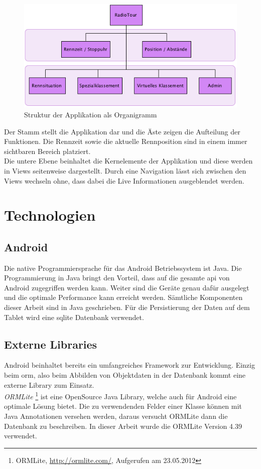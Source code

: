 \begin{figure}[h!]
\caption{Struktur der Applikation als Organigramm}
\centering
\includegraphics{05bericht/images/struktur.png}
\end{figure} 

Der Stamm stellt die Applikation dar und die Äste zeigen die Aufteilung der Funktionen. Die Rennzeit sowie die aktuelle Rennposition sind in einem immer sichtbaren Bereich platziert.
\\
Die untere Ebene beinhaltet die Kernelemente der Applikation und diese werden in Views seitenweise dargestellt. Durch eine Navigation lässt sich zwischen den Views wechseln ohne, dass dabei die Live Informationen ausgeblendet werden.


\section{Technologien}
\subsection{Android}
Die native Programmiersprache für das Android Betriebssystem ist Java. Die Programmierung in Java bringt den Vorteil, dass auf die gesamte \gls{api} von Android zugegriffen werden kann. Weiter sind die Geräte genau dafür ausgelegt und die optimale Performance kann erreicht werden. Sämtliche Komponenten dieser Arbeit sind in Java geschrieben. Für die Persistierung der Daten auf dem Tablet wird eine \gls{sqlite} Datenbank verwendet.

\subsection{Externe Libraries}
Android beinhaltet bereits ein umfangreiches Framework zur Entwicklung. Einzig beim \gls{orm}, also beim Abbilden von Objektdaten in der Datenbank kommt eine externe Library zum Einsatz.
\\
\textit{ORMLite} \footnote{ORMLite, \url{http://ormlite.com/}, Aufgerufen am 23.05.2012} ist eine OpenSource Java Library, welche auch für Android eine optimale Lösung bietet. Die zu verwendenden Felder einer Klasse können mit Java Annotationen versehen werden, daraus versucht ORMLite dann die Datenbank zu beschreiben. In dieser Arbeit wurde die ORMLite Version 4.39 verwendet.


